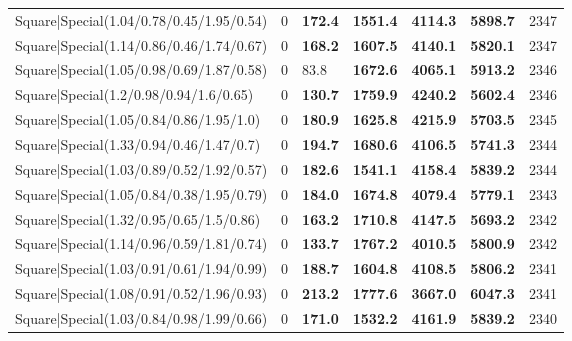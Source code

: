 \begin{tabular}{lrllllr}
 Square|Special(1.04/0.78/0.45/1.95/0.54)                      &             0   & \textbf{172.4} & \textbf{1551.4} & \textbf{4114.3} & \textbf{5898.7} &         2347 \\
 Square|Special(1.14/0.86/0.46/1.74/0.67)                      &             0   & \textbf{168.2} & \textbf{1607.5} & \textbf{4140.1} & \textbf{5820.1} &         2347 \\
 Square|Special(1.05/0.98/0.69/1.87/0.58)                      &             0   & 83.8           & \textbf{1672.6} & \textbf{4065.1} & \textbf{5913.2} &         2346 \\
 Square|Special(1.2/0.98/0.94/1.6/0.65)                        &             0   & \textbf{130.7} & \textbf{1759.9} & \textbf{4240.2} & \textbf{5602.4} &         2346 \\
 Square|Special(1.05/0.84/0.86/1.95/1.0)                       &             0   & \textbf{180.9} & \textbf{1625.8} & \textbf{4215.9} & \textbf{5703.5} &         2345 \\
 Square|Special(1.33/0.94/0.46/1.47/0.7)                       &             0   & \textbf{194.7} & \textbf{1680.6} & \textbf{4106.5} & \textbf{5741.3} &         2344 \\
 Square|Special(1.03/0.89/0.52/1.92/0.57)                      &             0   & \textbf{182.6} & \textbf{1541.1} & \textbf{4158.4} & \textbf{5839.2} &         2344 \\
 Square|Special(1.05/0.84/0.38/1.95/0.79)                      &             0   & \textbf{184.0} & \textbf{1674.8} & \textbf{4079.4} & \textbf{5779.1} &         2343 \\
 Square|Special(1.32/0.95/0.65/1.5/0.86)                       &             0   & \textbf{163.2} & \textbf{1710.8} & \textbf{4147.5} & \textbf{5693.2} &         2342 \\
 Square|Special(1.14/0.96/0.59/1.81/0.74)                      &             0   & \textbf{133.7} & \textbf{1767.2} & \textbf{4010.5} & \textbf{5800.9} &         2342 \\
 Square|Special(1.03/0.91/0.61/1.94/0.99)                      &             0   & \textbf{188.7} & \textbf{1604.8} & \textbf{4108.5} & \textbf{5806.2} &         2341 \\
 Square|Special(1.08/0.91/0.52/1.96/0.93)                      &             0   & \textbf{213.2} & \textbf{1777.6} & \textbf{3667.0} & \textbf{6047.3} &         2341 \\
 Square|Special(1.03/0.84/0.98/1.99/0.66)                      &             0   & \textbf{171.0} & \textbf{1532.2} & \textbf{4161.9} & \textbf{5839.2} &         2340 \\

\end{tabular}

